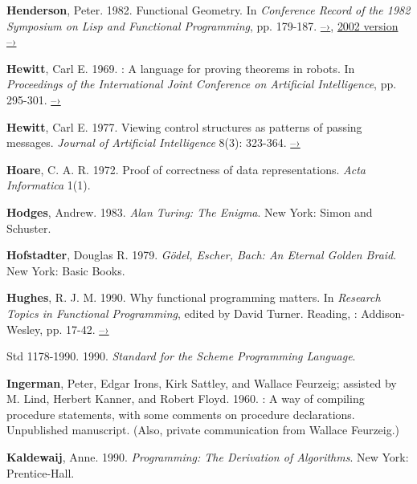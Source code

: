 { \label{Henderson 1982}
\textbf{Henderson}, Peter. 1982. Functional Geometry. In
\textit{Conference Record of the
1982  Symposium on Lisp and Functional Programming}, pp. 179-187.
\href{http://pmh-systems.co.uk/phAcademic/papers/funcgeo.pdf}{–›},
\href{http://eprints.soton.ac.uk/257577/1/funcgeo2.pdf}{2002 version –›}

 \label{Hewitt (1969)}
\textbf{Hewitt}, Carl E.  1969.  : A language for proving
theorems in robots.  In \textit{Proceedings of the International Joint
Conference on Artificial Intelligence}, pp. 295-301.
\href{http://dspace.mit.edu/handle/1721.1/6171}{–›}

 \label{Hewitt (1977)}
\textbf{Hewitt}, Carl E.  1977.  Viewing control structures as
patterns of passing
messages.  \textit{Journal of Artificial Intelligence} 8(3): 323-364.
\href{http://dspace.mit.edu/handle/1721.1/6272}{–›}

 \label{Hoare (1972)}
\textbf{Hoare}, C. A. R. 1972.  Proof of correctness of data representations.
\textit{Acta Informatica} 1(1).

 \label{Hodges 1983}
\textbf{Hodges}, Andrew. 1983.  \textit{Alan Turing: The Enigma}.
New York: Simon and
Schuster.

 \label{Hofstadter 1979}
\textbf{Hofstadter}, Douglas R.  1979.  \textit{G\"odel, Escher,
  Bach: An Eternal Golden
Braid}. New York: Basic Books.

 \label{Hughes 1990}
\textbf{Hughes}, R. J. M.  1990.  Why functional programming
matters.  In \textit{Research
Topics in Functional Programming}, edited by David Turner.
Reading, :
Addison-Wesley, pp. 17-42.
\href{http://www.cs.kent.ac.uk/people/staff/dat/miranda/whyfp90.pdf}{–›}

 \label{IEEE 1990}
 Std 1178-1990.  1990.
\textit{ Standard for the
Scheme Programming Language}.

 \label{Ingerman et al. 1960}
\textbf{Ingerman}, Peter, Edgar Irons, Kirk Sattley, and Wallace
Feurzeig; assisted by
M. Lind, Herbert Kanner, and Robert Floyd.  1960.  : A way of
compiling procedure statements, with some comments on procedure declarations.
Unpublished manuscript.  (Also, private communication from Wallace Feurzeig.)

 \label{Kaldewaij 1990}
\textbf{Kaldewaij}, Anne. 1990.  \textit{Programming: The
Derivation of Algorithms}. New
York: Prentice-Hall.

}

